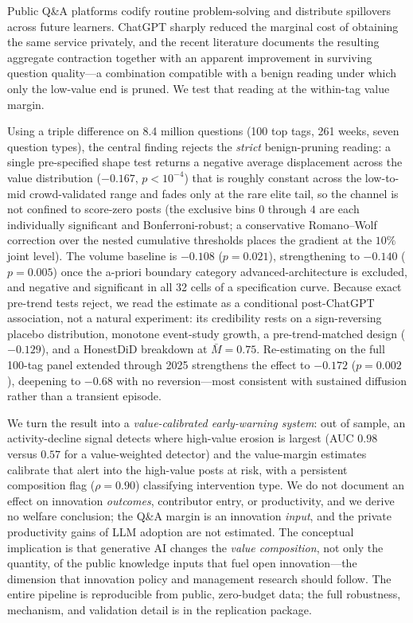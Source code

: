 \label{sec:conclusion_body}

Public Q\&A platforms codify routine problem-solving and
distribute spillovers across future learners. ChatGPT sharply
reduced the marginal cost of obtaining the same service
privately, and the recent literature
\citep{burtch2024chatgpt,delriochanona2024large,xue2026chatgpt}
documents the resulting aggregate contraction together with an
apparent improvement in surviving question quality---a
combination compatible with a benign reading under which only
the low-value end is pruned. We test that reading at the
within-tag value margin.

Using a triple difference on 8.4 million questions (100 top
tags, 261 weeks, seven question types), the central finding
rejects the \emph{strict} benign-pruning reading: a single
pre-specified shape test returns a negative average displacement
across the value distribution ($-0.167$, $p<10^{-4}$) that is
roughly constant across the low-to-mid crowd-validated range and
fades only at the rare elite tail, so the channel is not confined
to score-zero posts (the exclusive bins $0$ through $4$ are each
individually significant and Bonferroni-robust; a conservative
Romano--Wolf correction over the nested cumulative thresholds
places the gradient at the $10\%$ joint level). The volume
baseline is $-0.108$ ($p=0.021$), strengthening to $-0.140$
($p=0.005$) once the a-priori boundary category
advanced-architecture is excluded, and negative and significant
in all 32 cells of a specification curve. Because exact pre-trend
tests reject, we read the estimate as a conditional post-ChatGPT
association, not a natural experiment: its credibility rests on a
sign-reversing placebo distribution, monotone event-study growth,
a pre-trend-matched design ($-0.129$), and a HonestDiD breakdown
at $\bar M=0.75$. Re-estimating on the full 100-tag panel
extended through 2025 strengthens the effect to $-0.172$
($p=0.002$), deepening to $-0.68$ with no reversion---most
consistent with sustained diffusion rather than a transient
episode.

We turn the result into a \emph{value-calibrated early-warning
system}: out of sample, an activity-decline signal detects where
high-value erosion is largest (AUC $0.98$ versus $0.57$ for a
value-weighted detector) and the value-margin estimates
calibrate that alert into the high-value posts at risk, with a
persistent composition flag ($\rho=0.90$) classifying
intervention type. We do not document an effect on innovation
\emph{outcomes}, contributor entry, or productivity, and we
derive no welfare conclusion; the Q\&A margin is an innovation
\emph{input}, and the private productivity gains of LLM adoption
are not estimated. The conceptual implication is that generative
AI changes the \emph{value composition}, not only the quantity,
of the public knowledge inputs that fuel open innovation---the
dimension that innovation policy and management research should
follow. The entire pipeline is reproducible from public,
zero-budget data; the full robustness, mechanism, and validation
detail is in the replication package.

